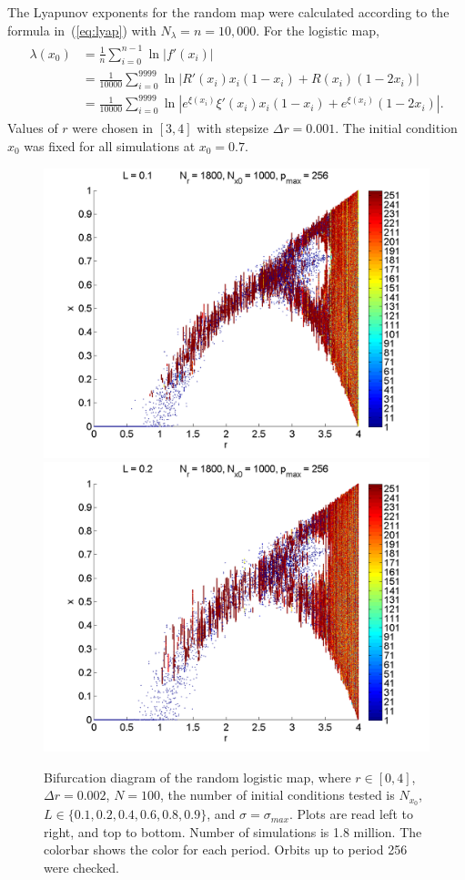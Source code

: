 The Lyapunov exponents for the random map were calculated according to
the formula in~(\ref{eq:lyap}) with $N_\lambda=n=10,000$. For the logistic map, 
\begin{align}
\begin{split}
\lambda(x_0) &= \frac{1}{n} \sum_{i=0}^{n-1} \ln |f'(x_i)|\\
&= \frac{1}{10000} \sum_{i=0}^{9999} \ln |R'(x_i)x_i(1-x_i) +R(x_i)(1-2x_i)|\\
&= \frac{1}{10000} \sum_{i=0}^{9999} \ln |e^{\xi(x_i)}\xi'(x_i)x_i(1-x_i)+e^{\xi(x_i)}(1-2x_i)|.
\end{split}
\end{align}
Values of $r$ were chosen in $[3,4]$ with stepsize $\Delta r =
0.001$. The initial condition $x_0$ was fixed for all
simulations at $x_0=0.7$.
\begin{figure}[H]\linespread{1}
\caption[Bifurcation diagram of the random logistic map, $\sigma=\sigma_{max}$]{Bifurcation diagram of the random
logistic map, where $r \in [0,4]$, $\Delta r = 0.002$, $N=100$, the
number of initial conditions tested is $N_{x_0}$, $L\in
\{0.1,0.2,0.4,0.6,0.8,0.9\}$, and $\sigma=\sigma_{max}$. Plots are read left to right, and top to
bottom. Number of simulations is 1.8 million. The colorbar shows the color for each period. Orbits up to period 256 were checked.}\label{fig:rlogbif}
	\begin{center}
		\includegraphics[width=.5\textwidth]{figs/rlog_bif_L_01.png}\hfill
		\includegraphics[width=.5\textwidth]{figs/rlog_bif_L_02.png}\\

\end{center}
\end{figure}
